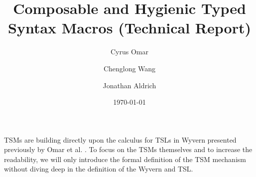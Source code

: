 \documentclass[12pt]{article}
\title{Composable and Hygienic Typed Syntax Macros (Technical Report)}
\author{Cyrus Omar \and Chenglong Wang \and Jonathan Aldrich}
\date{\today}
\begin{document}
\renewcommand*{\thepage}{title-\arabic{page}} 
\maketitle
\renewcommand*{\thepage}{\arabic{page}} 
\appendix

TSMs are building directly upon the calculus for TSLs in Wyvern presented previously by Omar et al. \cite{TSLs}. To focus on the TSMs themselves and to increase the readability, we will only introduce the formal definition of the TSM mechanism without diving deep in the definition of the Wyvern and TSL.





\FloatBarrier


\end{document}

